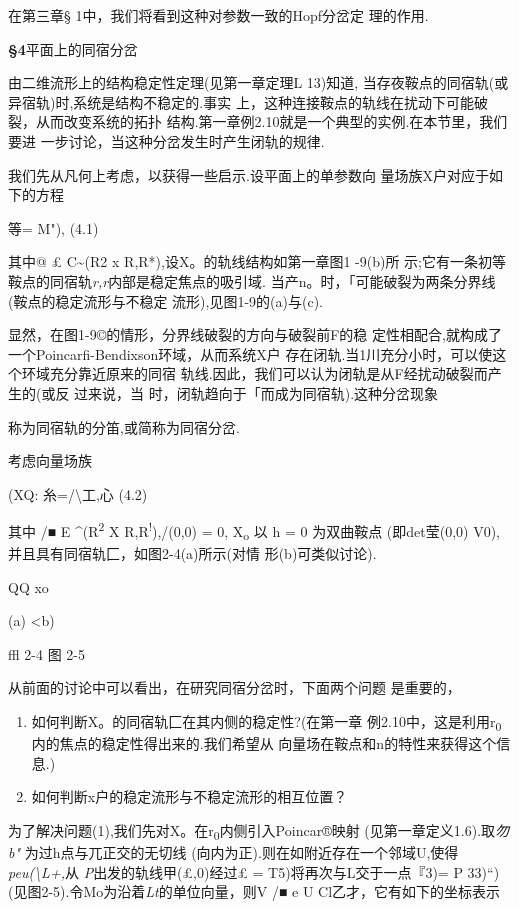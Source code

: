 \documentclass{article}
\begin{document}
在第三章§ 1中，我们将看到这种对参数一致的Hopf分岔定 理的作用.

\textbf{§4}平面上的同宿分岔

由二维流形上的结构稳定性定理(见第一章定理L 13)知道,
当存夜鞍点的同宿轨(或异宿轨)时,系统是结构不稳定的.事实
上，这种连接鞍点的轨线在扰动下可能破裂，从而改变系统的拓扑
结构.第一章例2.10就是一个典型的实例.在本节里，我们要进
一步讨论，当这种分岔发生时产生闭轨的规律.

我们先从凡何上考虑，以获得一些启示.设平面上的单参数向
量场族X户对应于如下的方程

等= M"), (4.1)

其中@ £ C\textasciitilde{}(R2 x R,R*),设X。的轨线结构如第一章图1 -9(b)所
示;它有一条初等鞍点的同宿轨\emph{r,r}内部是稳定焦点的吸引域.
当产n。时，「可能破裂为两条分界线(鞍点的稳定流形与不稳定
流形),见图1-9的(a)与(c).

显然，在图1-9©的情形，分界线破裂的方向与破裂前F的稳
定性相配合,就构成了一个Poincarfi-Bendixson环域，从而系统X户
存在闭轨.当1川充分小时，可以使这个环域充分靠近原来的同宿
轨线.因此，我们可以认为闭轨是从F经扰动破裂而产生的(或反 过来说，当
时，闭轨趋向于「而成为同宿轨).这种分岔现象

称为同宿轨的分笛,或简称为同宿分岔.

考虑向量场族

(XQ: 糸=/\textbackslash{}工,心 (4.2)

其中 /■ E \^{}(R\textsuperscript{2} X R,R\textsuperscript{!}),/(0,0) =
0, X\textsubscript{o} 以 h = 0 为双曲鞍点 (即det莹(0,0)
V0),并且具有同宿轨匚，如图2-4(a)所示(对情 形(b)可类似讨论).

QQ xo

(a) \textless{}b)

ffl 2-4 图 2-5

从前面的讨论中可以看出，在研究同宿分岔时，下面两个问题 是重要的，

\begin{enumerate}
\def\labelenumi{(\arabic{enumi})}
\item
  如何判断X。的同宿轨匚在其内侧的稳定性?(在第一章
  例2.10中，这是利用r\textsubscript{0}内的焦点的稳定性得出来的.我们希望从
  向量场在鞍点和n的特性来获得这个信息.)
\item
  如何判断x户的稳定流形与不稳定流形的相互位置？
\end{enumerate}

为了解决问题(1),我们先对X。在r\textsubscript{0}内侧引入Poincar®映射
(见第一章定义1.6).取\emph{勿 b"} 为过h点与兀正交的无切线
(向内为正).则在如附近存在一个邻域U,使得\emph{peu(\textbackslash{}L+,}从
\emph{P}出发的轨线甲(£,0)经过£ = T5)将再次与L交于一点『3)= P
33)``)(见图2-5).令Mo为沿着\emph{Lt}的单位向量，则V /■ e U
Cl乙才，它有如下的坐标表示
\end{document}
